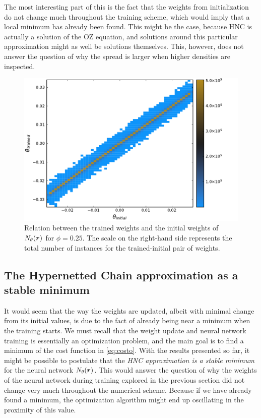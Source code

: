 The most interesting part of this is the fact that the weights from initialization
do not change much throughout the training scheme, which would imply that a local minimum
has already been found. This might be the case, because HNC is actually a solution of
the OZ equation, and solutions around this particular approximation might as well be
solutions themselves.
This, however, does not answer the question of why the spread is larger when
higher densities are inspected.

\begin{figure}[t]
    \includegraphics[width=\textwidth]{figuras/capitulo-4/weights_phi=0.25.pdf}
    \caption[Comparison between weights, $\phi=0.25$.]{Relation between the trained weights and the initial weights of $N_{\theta}(\bm{r})$ for $\phi=0.25$. The scale on the right-hand side represents the total number of instances for the trained-initial pair of weights.}
    \label{fig:pesos25}
\end{figure}

\subsection{The Hypernetted Chain approximation as a stable minimum}
It would seem that the way the weights are updated, albeit with minimal change from its
initial values, is due to the fact of already being near a minimum when the training starts.
We must recall that the weight update and neural network training is essentially an
optimization problem, and the main goal is to find a minimum
of the cost function in \autoref{eq:costo}. With the results presented so far, it might be
possible to postulate that the \emph{HNC approximation is a stable minimum} for the
neural network $N_{\theta}(\bm{r})$.
This would answer the question of why the weights of the neural network during training
explored in the previous section did not change very much throughout the numerical scheme.
Because if we have already found a minimum, the optimization algorithm might end up
oscillating in the proximity of this value.

